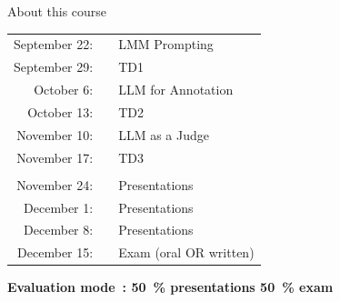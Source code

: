 \documentclass[serif, aspectratio=169]{beamer}
\begin{document}
\begin{frame}{About this course} %
    \begin{center}
        \begin{tabular}{|rp{3cm}l|}
            \hline
            September 22: && LMM Prompting \\
            September 29: && TD1 \\
            October 6: && LLM for Annotation \\
            October 13: && TD2 \\
            November 10: && LLM as a Judge \\
            November 17: && TD3 \\
            && \\
            November 24: && Presentations \\
            December 1: && Presentations \\
            December 8: && Presentations \\
            December 15: && Exam (oral OR written) \\
            \hline
        \end{tabular}
    \end{center}
    \begin{center}
        \textbf{Evaluation mode~: 50~\% presentations 50~\% exam}
    \end{center}
\end{frame}


\end{document}
